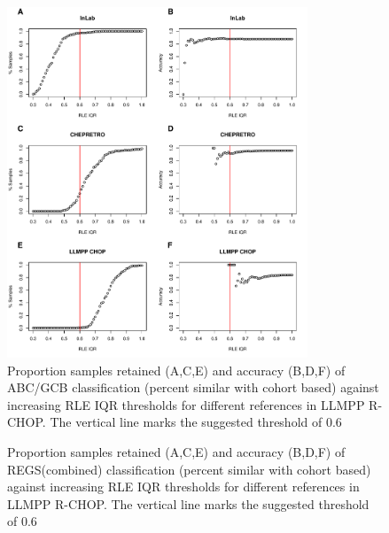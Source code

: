 \documentclass{article}
\begin{document}
\begin{figure}
	\begin{center}
		\includegraphics[width=0.8\textwidth]{figures/RCHOP_rle_classification_abcgcb.pdf}
	\end{center}
	\caption{Proportion samples retained (A,C,E) and accuracy (B,D,F) of ABC/GCB classification (percent similar with cohort based) against increasing RLE IQR thresholds for different references in LLMPP R-CHOP. The vertical line marks the suggested threshold of 0.6}
	\label{fig:RCHOP_rle_clas_abcgcb}
\end{figure}

\begin{figure}
	\begin{center}
	\end{center}
	\caption{Proportion samples retained (A,C,E) and accuracy (B,D,F) of REGS(combined) classification (percent similar with cohort based) against increasing RLE IQR thresholds for different references in LLMPP R-CHOP. The vertical line marks the suggested threshold of 0.6}
	\label{fig:RCHOP_rle_clas_regs}
\end{figure}

\clearpage

\end{document}
